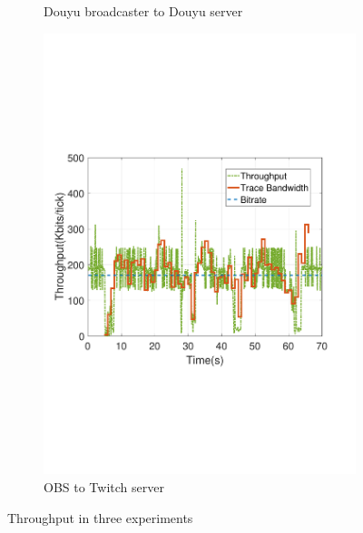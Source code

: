 \begin{figure}[htb]
\begin{subfigure}[b]{0.32\textwidth}
  \vspace{-0.05in}    
  \caption{Douyu broadcaster to Douyu server}
  \label{fig:douyu}
\end{subfigure}
\begin{subfigure}[b]{0.32\textwidth}%
  \includegraphics[width=0.8\linewidth]{fig/obs_twitch.pdf}
  \vspace{-0.05in}    
  \caption{OBS to Twitch server}
  \label{fig:obs-twitch}
\end{subfigure}
\caption{Throughput in three experiments}
\vspace{-0.15in}
\label{fig:commerical-throughput}
\end{figure}


